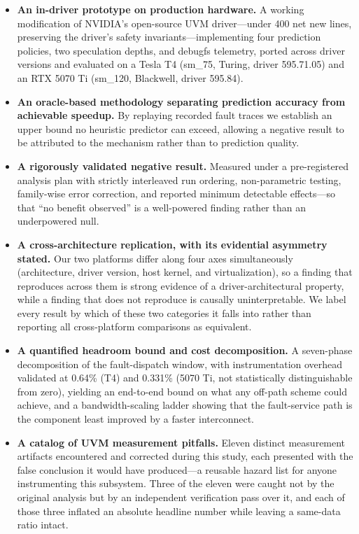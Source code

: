 \begin{itemize}
  \item \textbf{An in-driver prototype on production hardware.} A working
  modification of NVIDIA's open-source UVM driver---under 400 net new lines,
  preserving the driver's safety invariants---implementing four prediction
  policies, two speculation depths, and debugfs telemetry, ported across driver
  versions and evaluated on a Tesla T4 (sm\_75, Turing, driver 595.71.05) and an
  RTX 5070 Ti (sm\_120, Blackwell, driver 595.84).

  \item \textbf{An oracle-based methodology separating prediction accuracy from
  achievable speedup.} By replaying recorded fault traces we establish an upper
  bound no heuristic predictor can exceed, allowing a negative result to be
  attributed to the mechanism rather than to prediction quality.

  \item \textbf{A rigorously validated negative result.} Measured under a
  pre-registered analysis plan with strictly interleaved run ordering,
  non-parametric testing, family-wise error correction, and reported minimum
  detectable effects---so that ``no benefit observed'' is a well-powered finding
  rather than an underpowered null.

  \item \textbf{A cross-architecture replication, with its evidential asymmetry
  stated.} Our two platforms differ along four axes simultaneously
  (architecture, driver version, host kernel, and virtualization), so a finding
  that reproduces across them is strong evidence of a driver-architectural
  property, while a finding that does not reproduce is causally uninterpretable.
  We label every result by which of these two categories it falls into rather
  than reporting all cross-platform comparisons as equivalent.

  \item \textbf{A quantified headroom bound and cost decomposition.} A
  seven-phase decomposition of the fault-dispatch window, with instrumentation
  overhead validated at 0.64\% (T4) and 0.331\% (5070 Ti, not statistically
  distinguishable from zero), yielding an end-to-end bound on what any off-path
  scheme could achieve, and a bandwidth-scaling ladder showing that the
  fault-service path is the component least improved by a faster interconnect.

  \item \textbf{A catalog of UVM measurement pitfalls.} Eleven distinct
  measurement artifacts encountered and corrected during this study, each
  presented with the false conclusion it would have produced---a reusable hazard
  list for anyone instrumenting this subsystem. Three of the eleven were caught
  not by the original analysis but by an independent verification pass over it,
  and each of those three inflated an absolute headline number while leaving a
  same-data ratio intact.
\end{itemize}

